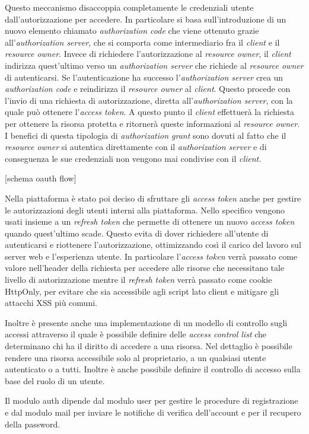 Questo meccanismo disaccoppia completamente le credenziali utente dall'autorizzazione per accedere.
In particolare si basa sull'introduzione di un nuovo elemento chiamato \textit{authorization code}
che viene ottenuto grazie all'\textit{authorization server}, che si comporta come intermediario fra il  \textit{client} e il \textit{resource owner}.
Invece di richiedere l'autorizzazione al \textit{resource owner}, il \textit{client} indirizza quest'ultimo verso un \textit{authorization server} che richiede al \textit{resource owner} di autenticarsi.
Se l'autenticazione ha successo l'\textit{authorization server} crea un \textit{authorization code} e reindirizza il \textit{resource owner} al \textit{client}.
Questo procede con l'invio di una richiesta di autorizzazione, diretta all'\textit{authorization server}, con la quale può ottenere l'\textit{access token}.
A questo punto il \textit{client} effettuerà la richiesta per ottenere la risorsa protetta e ritornerà queste informazioni al \textit{resource owner}.
I benefici di questa tipologia di \textit{authorization grant} sono dovuti al fatto che il \textit{resource owner} si autentica direttamente con il \textit{authorization server}
e di conseguenza le sue credenziali non vengono mai condivise con il \textit{client}.

[schema oauth flow]

Nella piattaforma è stato poi deciso di sfruttare gli \textit{access token} anche per gestire le autorizzazioni
degli utenti interni alla piattaforma. Nello specifico vengono usati insieme a un \textit{refresh token} che permette
di ottenere un nuovo \textit{access token} quando quest'ultimo scade. Questo evita di dover richiedere all'utente di autenticarsi
e riottenere l'autorizzazione, ottimizzando così il carico del lavoro sul server web e l'esperienza utente.
In particolare l'\textit{access token} verrà passato come valore nell'header della richiesta per accedere alle risorse che necessitano tale livello
di autorizzazione mentre il \textit{refresh token} verrà passato come cookie HttpOnly, per evitare che sia accessibile agli script lato client e mitigare
gli attacchi XSS più comuni.

Inoltre è presente anche una implementazione di un modello di controllo sugli accessi attraverso il quale è possibile definire delle \textit{access control list} che
determinano chi ha il diritto di accedere a una risorsa.
Nel dettaglio è possibile rendere una risorsa accessibile solo al proprietario, a un qualsiasi utente autenticato o a tutti.
Inoltre è anche possibile definire il controllo di accesso sulla base del ruolo di un utente.

Il modulo auth dipende dal modulo user per gestire le procedure di registrazione e
dal modulo mail per inviare le notifiche di verifica dell'account e per il recupero della password.
